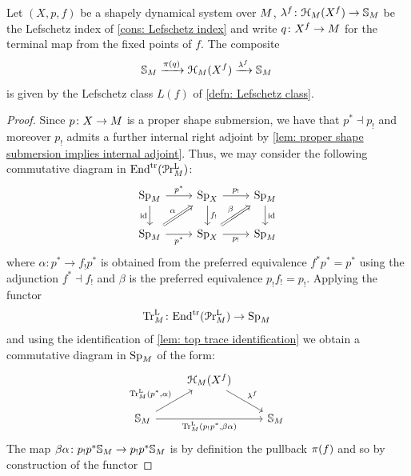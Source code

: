 \begin{thm}\label{thm: Top Lefschetz}
Let $(X,p,f)$ be a shapely dynamical system over $M$,
$\lambda^f\colon \cptSec{X^f}[\base] \to \SS_{\base}$ be
the Lefschetz index of \autoref{cons: Lefschetz index} and write 
$q\colon X^f\to M$ for the terminal map from the fixed points of $f$.
The composite 
\[ \SS_{\base} \xrightarrow{\pb{q}} \cptSec{X^f}[\base]
\xrightarrow{\lambda^f} \SS_{\base}\,\]
is given by the Lefschetz class $L(f)$ of \autoref{defn: Lefschetz class}. 
\end{thm}
\begin{proof}
  Since $p\colon X\to M$ is a proper shape submersion, we have that $p^* \dashv p_!$ and moreover
  $p_!$ admits a further internal right adjoint by \autoref{lem: proper shape submersion implies internal adjoint}.
  Thus, we may consider the following commutative diagram in $\mathrm{End}^{\mathrm{tr}}(\mathcal{P}\mathrm{r}^{\mathrm{L}}_{M})$:
\begin{equation}\label{eq: categorical factorization top}
   \begin{tikzcd}
	{\pSp{\base}} & {\pSp{X}} & {\pSp{\base}} \\
	{\pSp{\base}} & {\pSp{X}} & {\pSp{\base}}
	\arrow["{p^*}", from=1-1, to=1-2]
	\arrow["\id"', from=1-1, to=2-1]
	\arrow["{p_!}", from=1-2, to=1-3]
	\arrow["{f_!}", from=1-2, to=2-2]
	\arrow["\id", from=1-3, to=2-3]
	\arrow["\alpha", Rightarrow, from=2-1, to=1-2]
	\arrow["{p^*}"', from=2-1, to=2-2]
	\arrow["\beta", Rightarrow, from=2-2, to=1-3]
	\arrow["{p_!}"', from=2-2, to=2-3]
\end{tikzcd} 
    \end{equation}
    where $\alpha\colon p^*\to f_!p^*$ is obtained from  the preferred equivalence $f^*p^* = p^*$ 
    using the adjunction $f^*\dashv f_!$ and $\beta$ is the preferred
    equivalence $p_!f_!=p_!$. Applying the functor 
    \[ \TrcL\colon \Endtrl(\pPrlf{\base})\to \pSp{\base}\,\]
    and using the identification of \autoref{lem: top trace identification} 
    we obtain a commutative diagram in $\pSp{\base}$ of the form:
    \[
\begin{tikzcd}
	{} & {\cptSec{X^f}[\base]} & \\
	{\SS_{\base}} && {\SS_{\base}}
	\arrow["{\lambda^f}", from=1-2, to=2-3]
	\arrow["{\TrcL(p^*,\alpha)}", from=2-1, to=1-2]
	\arrow["{\TrcL(p_!p^*, \beta\alpha)}"', from=2-1, to=2-3]
\end{tikzcd}
    \]
    The map $\beta\alpha\colon p_!p^*\mathbb{S}_{M}\to p_!p^*\mathbb{S}_{M}$ is by definition
    the pullback $\pi(f)$ and so by construction of the functor 

\end{proof}
